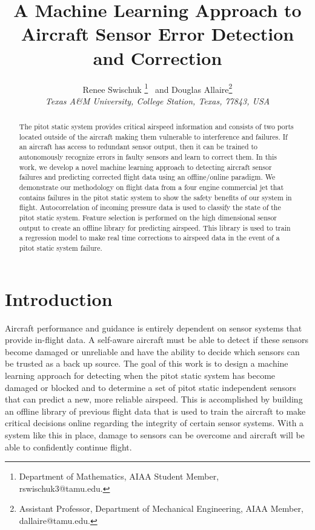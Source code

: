\documentclass[]{aiaa-tc}
\title{A Machine Learning Approach to Aircraft Sensor Error Detection and Correction}
\author{
  Renee Swischuk%
    \thanks{Department of Mathematics, AIAA Student Member, rswischuk3@tamu.edu.}
  \ and Douglas Allaire\thanks{Assistant Professor, Department of Mechanical Engineering, AIAA Member, dallaire@tamu.edu.}\\
  {\normalsize\itshape
   Texas A\&M University, College Station, Texas, 77843, USA}
 }
\begin{document}
\maketitle

\begin{abstract}
The pitot static system provides critical airspeed information and consists of two ports located outside of the aircraft making them vulnerable to interference and failures. If an aircraft has access to redundant sensor output, then it can be trained to autonomously recognize errors in faulty sensors and learn to correct them. In this work, we develop a novel machine learning approach to detecting aircraft sensor failures and predicting corrected flight data using an offline/online paradigm.  We demonstrate our methodology on flight data from a four engine commercial jet that contains failures in the pitot static system to show the safety benefits of our system in flight. Autocorrelation of incoming pressure data is used to classify the state of the pitot static system. Feature selection is performed on the high dimensional sensor output to create an offline library for predicting airspeed. This library is used to train a regression model to make real time corrections to airspeed data in the event of a pitot static system failure. 
\end{abstract}


\section{Introduction}
Aircraft performance and guidance is entirely dependent on sensor systems that provide in-flight data. A self-aware aircraft must be able to detect if these sensors become damaged or unreliable and have the ability to decide which sensors can be trusted as a back up source. The goal of this work is to design a machine learning approach for detecting when the pitot static system has become damaged or blocked and to determine a set of pitot static independent sensors that can predict a new, more reliable airspeed. This is accomplished by building an offline library of previous flight data that is used to train the aircraft to make critical decisions online regarding the integrity of certain sensor systems. With a system like this in place, damage to sensors can be overcome and aircraft will be able to confidently continue flight. 
\end{document}
